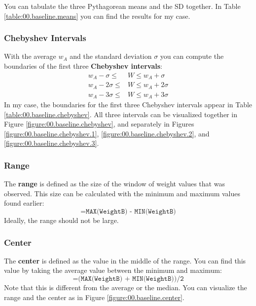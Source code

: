 You can tabulate the three Pythagorean means and the SD together. In Table \ref{table:00.baseline.means} you can find the results for my case.
\subsubsection{Chebyshev Intervals}
With the average $w_{A}$ and the standard deviation $\sigma$ you can compute the boundaries of the first three \textbf{Chebyshev intervals}:
\begin{align}
    w_{A} - \sigma \leq {}&W \leq w_{A} + \sigma \\
    w_{A} - 2\sigma \leq {}&W \leq w_{A} + 2\sigma \\
    w_{A} - 3\sigma \leq {}&W \leq w_{A} + 3\sigma
\end{align}
In my case, the boundaries for the first three Chebyshev intervals appear in Table \ref{table:00.baseline.chebyshev}. All three intervals can be visualized together in Figure \ref{figure:00.baseline.chebyshev}, and separately in Figures \ref{figure:00.baseline.chebyshev.1}, \ref{figure:00.baseline.chebyshev.2}, and \ref{figure:00.baseline.chebyshev.3}.
\subsubsection{Range}
The \textbf{range} is defined as the size of the window of weight values that was observed. This size can be calculated with the minimum and maximum values found earlier:
\begin{equation}
    \texttt{=MAX(WeightB) - MIN(WeightB)}
\end{equation}
Ideally, the range should not be large.
\subsubsection{Center}
The \textbf{center} is defined as the value in the middle of the range. You can find this value by taking the average value between the minimum and maximum:
\begin{equation}
    \texttt{=(MAX(WeightB) + MIN(WeightB))/2}
\end{equation}
Note that this is different from the average or the median. You can visualize the range and the center as in Figure \ref{figure:00.baseline.center}.
